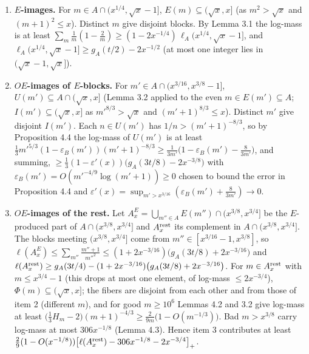 \documentclass[11pt,a4paper]{article}
\begin{document}
\begin{enumerate}
\def\labelenumi{\arabic{enumi}.}
\item
  \textbf{\(E\)-images.} For \(m\in A\cap(x^{1/4},\sqrt x-1]\),
  \(E(m)\subseteq(\sqrt x,x]\) (as \(m^2>\sqrt x\) and
  \((m+1)^2\le x\)). Distinct \(m\) give disjoint blocks. By Lemma 3.1
  the log-mass is at least
  \(\sum_m\frac1m(1-\frac2m)\ge(1-2x^{-1/4})\,\ell_A(x^{1/4},\sqrt x-1]\),
  and \(\ell_A(x^{1/4},\sqrt x-1]\ge g_A(t/2)-2x^{-1/2}\) (at most one
  integer lies in \((\sqrt x-1,\sqrt x]\)).
\item
  \textbf{\(OE\)-images of \(E\)-blocks.} For
  \(m'\in A\cap(x^{3/16},x^{3/8}-1]\),
  \(U(m')\subseteq A\cap(\sqrt x,x]\) (Lemma 3.2 applied to the even
  \(m\in E(m')\subseteq A\); \(I(m')\subseteq(\sqrt x,x]\) as
  \(m'^{8/3}>\sqrt x\) and \((m'+1)^{8/3}\le x\)). Distinct \(m'\) give
  disjoint \(I(m')\). Each \(n\in U(m')\) has \(1/n>(m'+1)^{-8/3}\), so
  by Proposition 4.4 the log-mass of \(U(m')\) is at least
  \(\tfrac13m'^{5/3}(1-\varepsilon_B(m'))(m'+1)^{-8/3}\ge\frac1{3m'}\bigl(1-\varepsilon_B(m')-\tfrac8{3m'}\bigr)\),
  and summing,
  \(\ge\tfrac13(1-\varepsilon'(x))\bigl(g_A(3t/8)-2x^{-3/8}\bigr)\) with
  \(\varepsilon_B(m')=O(m'^{-4/9}\log(m'+1))\ge0\) chosen to bound the
  error in Proposition 4.4 and
  \(\varepsilon'(x)=\sup_{m'>x^{3/16}}(\varepsilon_B(m')+\tfrac8{3m'})\to0\).
\item
  \textbf{\(OE\)-images of the rest.} Let
  \(A^{E}_x=\bigcup_{m''\in A}E(m'')\cap(x^{3/8},x^{3/4}]\) be the
  \(E\)-produced part of \(A\cap(x^{3/8},x^{3/4}]\) and
  \(A^{\rm rest}_x\) its complement in \(A\cap(x^{3/8},x^{3/4}]\). The
  blocks meeting \((x^{3/8},x^{3/4}]\) come from
  \(m''\in[x^{3/16}-1,x^{3/8}]\), so
  \(\ell(A^E_x)\le\sum_{m''}\frac{m''+1}{m''^2}\le(1+2x^{-3/16})\bigl(g_A(3t/8)+2x^{-3/16}\bigr)\)
  and
  \(\ell(A^{\rm rest}_x)\ge g_A(3t/4)-(1+2x^{-3/16})\bigl(g_A(3t/8)+2x^{-3/16}\bigr)\).
  For \(m\in A^{\rm rest}_x\) with \(m\le x^{3/4}-1\) (this drops at
  most one element, of log-mass \(\le 2x^{-3/4}\)),
  \(\Phi(m)\subseteq(\sqrt x,x]\); the fibers are disjoint from each
  other and from those of item 2 (different \(m\)), and for good
  \(m\ge 10^6\) Lemmas 4.2 and 3.2 give log-mass at least
  \(\bigl(\tfrac13H_m-2\bigr)(m+1)^{-4/3}\ge\frac2{9m}\bigl(1-O(m^{-1/3})\bigr)\).
  Bad \(m>x^{3/8}\) carry log-mass at most \(306x^{-1/8}\) (Lemma 4.3).
  Hence item 3 contributes at least
  \(\tfrac2{9}(1-O(x^{-1/8}))\bigl[\ell(A^{\rm rest}_x)-306x^{-1/8}-2x^{-3/4}\bigr]_+\).
\end{enumerate}
\end{document}
